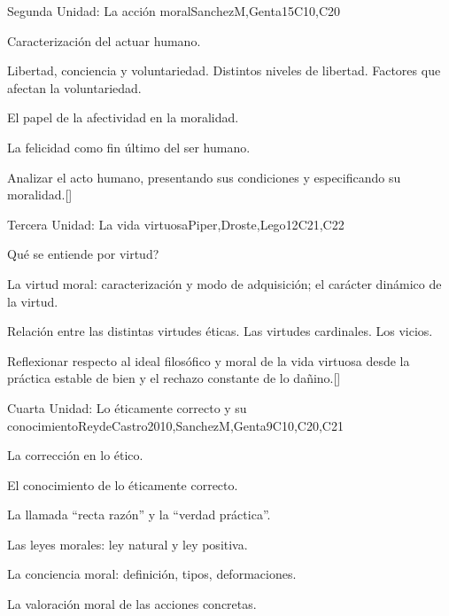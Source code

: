 \begin{syllabus}
\begin{unit}{}{Segunda Unidad: La acción moral}{SanchezM,Genta}{15}{C10,C20}
\begin{topics}
    \item Caracterización del actuar humano.
    \item Libertad, conciencia y voluntariedad. Distintos niveles de libertad. Factores que afectan la voluntariedad.
    \item El papel de la afectividad en la moralidad.
    \item La felicidad como fin último del ser humano.

\end{topics}
\begin{learningoutcomes}
	\item Analizar el acto humano, presentando sus condiciones y especificando su moralidad.[\Familiarity]
\end{learningoutcomes}
\end{unit}

\begin{unit}{}{Tercera Unidad: La vida virtuosa}{Piper,Droste,Lego}{12}{C21,C22}
\begin{topics}
    \item Qué se entiende por virtud?
    \item La virtud moral: caracterización y modo de adquisición; el carácter dinámico de la virtud.
    \item Relación entre las distintas virtudes éticas. Las virtudes cardinales. Los vicios.
\end{topics}
\begin{learningoutcomes}
	\item Reflexionar respecto al ideal filosófico y moral de la vida virtuosa desde la práctica estable de bien y el rechazo constante de lo dañino.[\Familiarity]
\end{learningoutcomes}
\end{unit}

\begin{unit}{}{Cuarta Unidad: Lo éticamente correcto y su conocimiento}{ReydeCastro2010,SanchezM,Genta}{9}{C10,C20,C21}
\begin{topics}
    \item La corrección en lo ético.
    \item El conocimiento de lo éticamente correcto.
    \item La llamada ``recta razón'' y la ``verdad práctica''.
    \item Las leyes morales: ley natural y ley positiva.
    \item La conciencia moral: definición, tipos, deformaciones.
    \item La valoración moral de las acciones concretas.
\end{topics}


\end{unit}
\end{syllabus}
